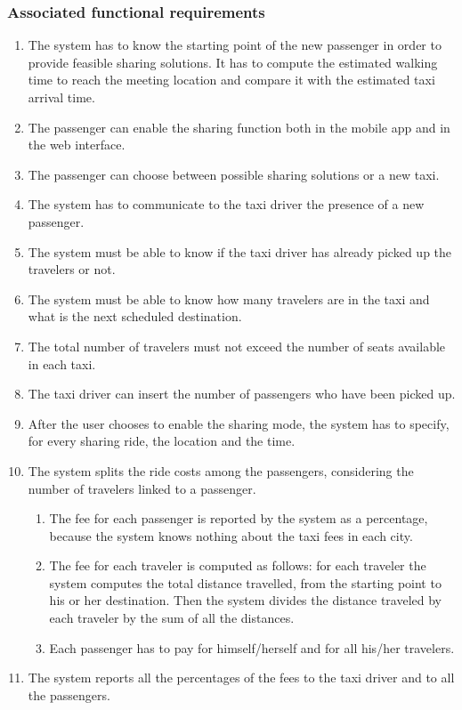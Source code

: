 \subsubsection{Associated functional requirements}
\begin{enumerate}
	\item The system has to know the starting point of the new passenger in order to provide feasible sharing solutions.
	It has to compute the estimated walking time to reach the meeting location and compare it with the estimated taxi arrival time.
	\item The passenger can enable the sharing function both in the mobile app and in the web interface.
	\item The passenger can choose between possible sharing solutions or a new taxi.
	\item The system has to communicate to the taxi driver the presence of a new passenger.
	\item The system must be able to know if the taxi driver has already picked up the travelers or not.
	\item The system must be able to know how many travelers are in the taxi and what is the next scheduled destination.
	\item The total number of travelers must not exceed the number of seats available in each taxi.
	\item The taxi driver can insert the number of passengers who have been picked up.
	\item After the user chooses to enable the sharing mode, the system has to specify, for every sharing ride, the location and the time.
	\item The system splits the ride costs among the passengers, considering the number of travelers linked to a passenger.
	\begin{enumerate}
		\item The fee for each passenger is reported by the system as a percentage, because the system knows nothing about the taxi fees in each city.
		\item The fee for each traveler is computed as follows: for each traveler the system computes the total distance travelled, from the starting point to his or her destination. Then the system divides the distance traveled by each traveler by the sum of all the distances.
		\item Each passenger has to pay for himself/herself and for all his/her travelers.
	\end{enumerate}
	\item The system reports all the percentages of the fees to the taxi driver and to all the passengers.
\end{enumerate}
